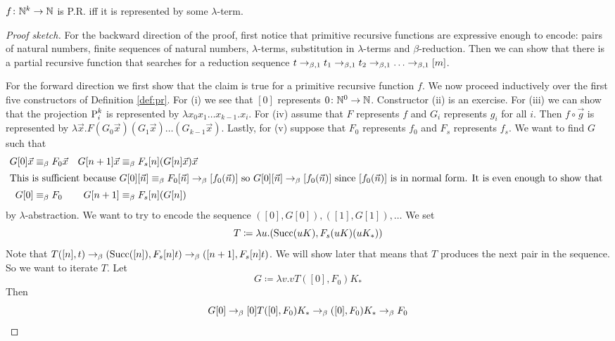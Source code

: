 \begin{boxthm}
    $f \colon \mathbb{N}^k \to \mathbb{N}$ is P.R. iff it is represented by some $\lambda$-term.
\end{boxthm}
\begin{proof}[Proof sketch]
    For the backward direction of the proof, first notice that primitive recursive functions are expressive enough to encode: pairs of natural numbers, finite sequences of natural numbers, $\lambda$-terms, substitution in $\lambda$-terms and $\beta$-reduction.
Then we can show that there is a partial recursive function that searches for a reduction sequence $t \beored t_1 \beored t_2 \beored \dots \beored [m]$.

For the forward direction we first show that the claim is true for a primitive recursive function $f$.
We now proceed inductively over the first five constructors of Definition \ref{def:pr}.
For (i) we see that $[0]$ represents $0 \colon \mathbb{N}^0 \to \mathbb{N}$.
Constructor (ii) is an exercise.
For (iii) we can show that the projection $\text{P}_{i}^{k}$ is represented by $\lambda x_0 x_1 \dots x_{k-1}. x_i$.
For (iv) assume that $F$ represents $f$ and $G_i$ represents $g_i$ for all $i$.
Then $f \circ \vec{g}$ is represented by $\lambda \vec{x}. F (G_0 \vec{x}) (G_1 \vec{x}) \dots (G_{k-1} \vec{x})$.
Lastly, for (v) suppose that $F_0$ represents $f_0$ and $F_s$ represents $f_s$.
We want to find $G$ such that
\begin{align*}
    G[0]\vec{x} &\equiv_{\beta} F_0 \vec{x} & G[n + 1]\vec{x} &\equiv_{\beta} F_s [n] (G[n] \vec{x})\vec{x} \\
    \intertext{This is sufficient because $G[0][\vec{n}] \equiv_{\beta} F_0[\vec{n}] \to_{\beta} [f_0(\vec{n})]$ so $G[0][\vec{n}] \to_{\beta} [f_0(\vec{n})]$ since $[f_0(\vec{n})]$ is in normal form. It is even enough to show that }
    G[0] &\equiv_{\beta} F_0 & G[n + 1] &\equiv_{\beta} F_s[n](G[n])
\end{align*}
by $\lambda$-abstraction.
We want to try to encode the sequence $([0], G[0]), ([1], G[1]), \dots$
We set
\begin{equation*}
T \coloneq \lambda u. (\operatorname{Succ}(uK), F_s(uK)(uK_*))
\end{equation*}
Note that $T([n], t) \to_{\beta} (\operatorname{Succ}([n]), F_s[n]t) \to_{\beta} ([n + 1], F_s[n]t)$.
We will show later that means that $T$ produces the next pair in the sequence.
So we want to iterate $T$.
Let
\begin{equation*}
    G \coloneq \lambda v.vT([0], F_0)K_*
\end{equation*}
Then
\begin{equation*}
    G[0] \to_{\beta} [0]T([0], F_0)K_* \to_{\beta} ([0], F_0) K_* \to_{\beta} F_0
\end{equation*}


\end{proof}
